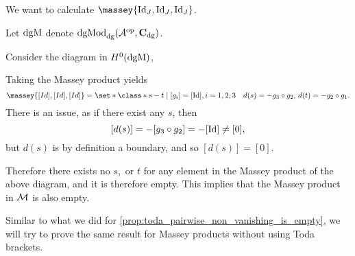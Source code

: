 \begin{example}
	We want to calculate \( \massey{\Id_J, \Id_J, \Id_J} \).

    Let \( \operatorname{dgM} \) denote \( \operatorname{dgMod}_{\operatorname{dg}}({\mathcal{A}}^{\operatorname{op}}, \operatorname{\mathbf{C}}_{\operatorname{dg}}) \).

    Consider the diagram in \( H^0(\operatorname{dgM}) \),
    \begin{center}
    \end{center}

    Taking the Massey product yields
    \[
        \massey{[Id], [Id], [Id]} =
        \set*{
            \class*{
                s - t
            }
            \mid [g_i] = [\Id], i = 1, 2, 3 \quad
            d(s) = - g_3 \circ g_2, \,
            d(t) = -g_2 \circ g_1
        }.
    \]
    There is an issue, as if there exist any \( s \), then
    \[
        [d(s)] = - [g_3 \circ g_2] = - [\operatorname{Id}] \neq [0],
    \]
    but \( d(s) \) is by definition a boundary, and so \( [d(s)] = [0] \).

    Therefore there exists no \( s, \) or \( t \) for any element in the Massey product of the above diagram, and it is therefore empty. This implies that the Massey product in \( {\mathcal{M}} \) is also empty.
\end{example}

Similar to what we did for \autoref{prop:toda_pairwise_non_vanishing_is_empty}, we will try to prove the same result for Massey products without using Toda brackets.

